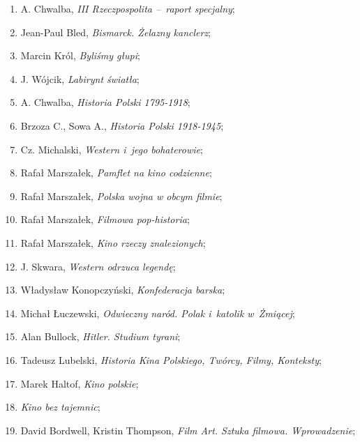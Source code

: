 \documentclass[a4paper,11pt]{article}
\begin{document}
\begin{enumerate}
\item A. Chwalba, \emph{III Rzeczpospolita --~raport specjalny};

\item Jean-Paul Bled, \emph{Bismarck. Żelazny kanclerz};

\item Marcin Król, \emph{Byliśmy głupi};

\item J. Wójcik, \emph{Labirynt światła};

\item A. Chwalba, \emph{Historia Polski 1795-1918};

\item Brzoza C., Sowa A., \emph{Historia Polski 1918-1945};

\item Cz. Michalski, \emph{Western i~jego bohaterowie};

\item Rafał Marszałek, \emph{Pamflet na kino codzienne};

\item Rafał Marszałek, \emph{Polska wojna w obcym filmie};

\item Rafał Marszałek, \emph{Filmowa pop-historia};

\item Rafał Marszałek, \emph{Kino rzeczy znalezionych};

\item J. Skwara, \emph{Western odrzuca legendę};

\item Władysław Konopczyński, \emph{Konfederacja barska};

\item Michał Łuczewski, \emph{Odwieczny naród. Polak i~katolik
    w~Żmiącej};

\item Alan Bullock, \emph{Hitler. Studium tyrani};

\item Tadeusz Lubelski, \emph{Historia Kina Polskiego, Twórcy, Filmy,
    Konteksty};

\item Marek Haltof, \emph{Kino polskie};

\item \emph{Kino bez tajemnic};

\item David Bordwell, Kristin Thompson, \emph{Film Art. Sztuka
    filmowa. Wprowadzenie};


\end{enumerate}
\end{document}
